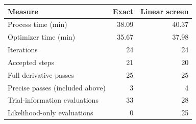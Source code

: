 \begin{tabular}{lrr}
\toprule
Measure & Exact & Linear screen \\
\midrule
Process time (min) & 38.09 & 40.37 \\
Optimizer time (min) & 35.67 & 37.98 \\
Iterations & 24 & 24 \\
Accepted steps & 21 & 20 \\
Full derivative passes & 25 & 25 \\
Precise passes (included above) & 3 & 4 \\
Trial-information evaluations & 33 & 28 \\
Likelihood-only evaluations & 0 & 25 \\
\bottomrule
\end{tabular}
